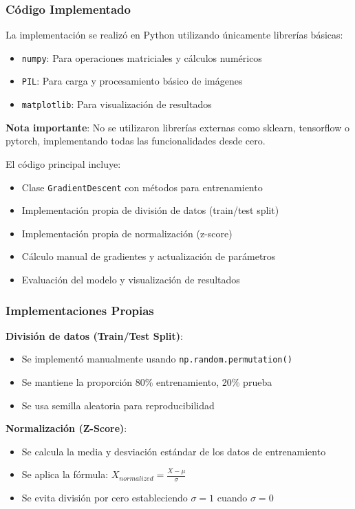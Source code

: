 \documentclass[a4paper,12pt]{article}
\begin{document}
\subsubsection{Código Implementado}
La implementación se realizó en Python utilizando únicamente librerías básicas:
\begin{itemize}
    \item \texttt{numpy}: Para operaciones matriciales y cálculos numéricos
    \item \texttt{PIL}: Para carga y procesamiento básico de imágenes
    \item \texttt{matplotlib}: Para visualización de resultados
\end{itemize}

\textbf{Nota importante}: No se utilizaron librerías externas como sklearn, tensorflow o pytorch, implementando todas las funcionalidades desde cero.

El código principal incluye:
\begin{itemize}
    \item Clase \texttt{GradientDescent} con métodos para entrenamiento
    \item Implementación propia de división de datos (train/test split)
    \item Implementación propia de normalización (z-score)
    \item Cálculo manual de gradientes y actualización de parámetros
    \item Evaluación del modelo y visualización de resultados
\end{itemize}

\subsubsection{Implementaciones Propias}

\textbf{División de datos (Train/Test Split)}:
\begin{itemize}
    \item Se implementó manualmente usando \texttt{np.random.permutation()}
    \item Se mantiene la proporción 80\% entrenamiento, 20\% prueba
    \item Se usa semilla aleatoria para reproducibilidad
\end{itemize}

\textbf{Normalización (Z-Score)}:
\begin{itemize}
    \item Se calcula la media y desviación estándar de los datos de entrenamiento
    \item Se aplica la fórmula: $X_{normalized} = \frac{X - \mu}{\sigma}$
    \item Se evita división por cero estableciendo $\sigma = 1$ cuando $\sigma = 0$
\end{itemize}
\end{document}

